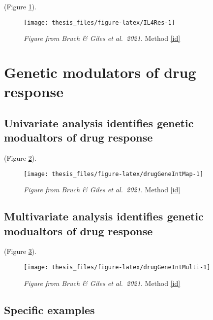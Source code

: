 \documentclass[11pt, a4paper, twosided]{book}
\begin{document}
(Figure \ref{fig:IL4Res}).


\begin{figure}

{\centering \texttt{[image: thesis\_files/figure-latex/IL4Res-1]} 

}

\caption{\emph{Figure from Bruch \& Giles et al.~2021.} Method \ref{id}}\label{fig:IL4Res}
\end{figure}
\hypertarget{genetic-modulators-of-drug-response}{%
\section{Genetic modulators of drug response}\label{genetic-modulators-of-drug-response}}

\hypertarget{univariate-analysis-identifies-genetic-modualtors-of-drug-response}{%
\subsection{Univariate analysis identifies genetic modualtors of drug response}\label{univariate-analysis-identifies-genetic-modualtors-of-drug-response}}

(Figure \ref{fig:drugGeneIntMap}).


\begin{figure}

{\centering \texttt{[image: thesis\_files/figure-latex/drugGeneIntMap-1]} 

}

\caption{\emph{Figure from Bruch \& Giles et al.~2021.} Method \ref{id}}\label{fig:drugGeneIntMap}
\end{figure}
\hypertarget{multivariate-analysis-identifies-genetic-modualtors-of-drug-response}{%
\subsection{Multivariate analysis identifies genetic modualtors of drug response}\label{multivariate-analysis-identifies-genetic-modualtors-of-drug-response}}

(Figure \ref{fig:drugGeneIntMulti}).


\begin{figure}

{\centering \texttt{[image: thesis\_files/figure-latex/drugGeneIntMulti-1]} 

}

\caption{\emph{Figure from Bruch \& Giles et al.~2021.} Method \ref{id}}\label{fig:drugGeneIntMulti}
\end{figure}
\hypertarget{specific-examples}{%
\subsection{Specific examples}\label{specific-examples}}
\end{document}
